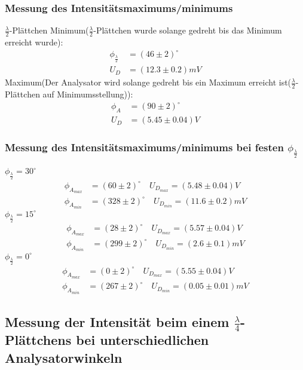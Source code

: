 \documentclass[a4paper]{article}
\begin{document}
\subsubsection{Messung des Intensitätsmaximums/minimums }$\frac{\lambda}{2}$-Plättchen
Minimum($\frac{\lambda}{2}$-Plättchen wurde solange gedreht bis das Minimum erreicht wurde):
\begin{align}
\phi_{\frac{\lambda}{2}}&=(46 \pm 2)^\circ\\
U_D &= (12.3 \pm 0.2)mV
\end{align}
Maximum(Der Analysator wird solange gedreht bis ein Maximum erreicht ist($\frac{\lambda}{2}$-Plättchen auf Minimumsstellung)):
\begin{align}
\phi_{A}&=(90\pm2)^\circ\\
U_D &= (5.45 \pm 0.04)V
\end{align}
\subsubsection{Messung des Intensitätsmaximums/minimums bei festen $\phi_{\frac{\lambda}{2}}$}
$\phi_{\frac{\lambda}{2}}= 30^\circ$
\begin{align}
\phi_{A_{max}}&=(60\pm 2)^\circ \quad U_{D_{max}}=(5.48\pm0.04)V  \\
\phi_{A_{min}}&=(328\pm 2)^\circ \quad U_{D_{min}}=(11.6\pm0.2)mV  
\end{align}
$\phi_{\frac{\lambda}{2}}= 15^\circ$
\begin{align}
\phi_{A_{max}}&=(28 \pm 2)^\circ \quad U_{D_{max}}=(5.57\pm0.04)V \\ 
\phi_{A_{min}}&=(299 \pm 2)^\circ \quad U_{D_{min}}=(2.6\pm 0.1)mV  
\end{align}
$\phi_{\frac{\lambda}{2}}= 0^\circ$
\begin{align}
\phi_{A_{max}}&=(0\pm2)^\circ \quad U_{D_{max}}=(5.55 \pm 0.04)V  \\
\phi_{A_{min}}&=(267\pm 2)^\circ \quad U_{D_{min}}=(0.05 \pm 0.01)mV  
\end{align}
\newpage

\subsection{Messung der Intensität beim einem $\frac{\lambda}{4}$-Plättchens bei unterschiedlichen Analysatorwinkeln}
\end{document}
